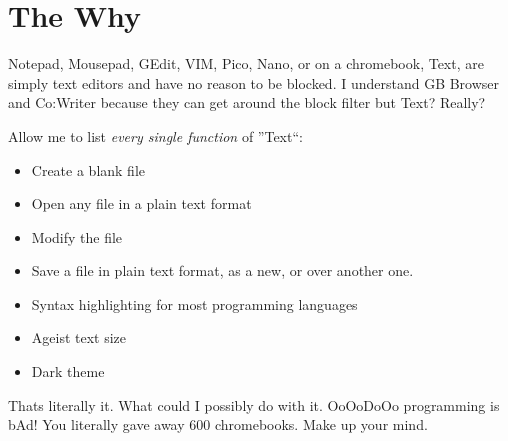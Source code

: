 \documentclass{article}
\begin{document}
\section{The Why}
Notepad, Mousepad, GEdit, VIM, Pico, Nano, or on a chromebook,
Text, are simply text editors and have no reason to be blocked.
I understand GB Browser and Co:Writer because they can get around
the block filter but Text? Really?

Allow me to list \emph{every single function} of ''Text``:
\begin{itemize}
    \item Create a blank file
    \item Open any file in a plain text format
    \item Modify the file
    \item Save a file in plain text format, as a new, or over another one.
    \item Syntax highlighting for most programming languages
    \item Ageist text size
    \item Dark theme
\end{itemize}
Thats literally it. What could I possibly do with it. OoOoDoOo 
programming is bAd! You literally gave away 600 chromebooks. Make
up your mind.
\end{document}

